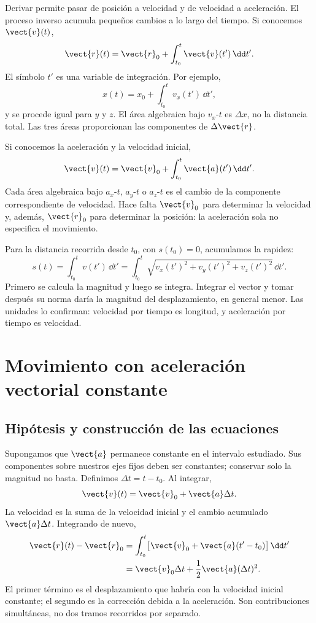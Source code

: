 Derivar permite pasar de posición a velocidad y de velocidad a aceleración.
El proceso inverso acumula pequeños cambios a lo largo del tiempo.
Si conocemos \(\vect{v}(t)\),
\[ \vect{r}(t)=\vect{r}_0+\int_{t_0}^{t}\vect{v}(t')\,\dd t'. \]
El símbolo \(t'\) es una variable de integración. Por ejemplo,
\[ x(t)=x_0+\int_{t_0}^{t}v_x(t')\,\dd t', \]
y se procede igual para \(y\) y \(z\). El área algebraica bajo
\(v_x\)-\(t\) es \(\Delta x\), no la distancia total. Las tres áreas
proporcionan las componentes de \(\Delta\vect{r}\).

Si conocemos la aceleración y la velocidad inicial,
\[ \vect{v}(t)=\vect{v}_0+\int_{t_0}^{t}\vect{a}(t')\,\dd t'. \]
Cada área algebraica bajo \(a_x\)-\(t\), \(a_y\)-\(t\) o \(a_z\)-\(t\)
es el cambio de la componente correspondiente de velocidad. Hace falta
\(\vect{v}_0\) para determinar la velocidad y, además, \(\vect{r}_0\)
para determinar la posición: la aceleración sola no especifica el movimiento.

Para la distancia recorrida desde \(t_0\), con \(s(t_0)=0\), acumulamos
la rapidez:
\[ s(t)=\int_{t_0}^{t}v(t')\,\dd t'
=\int_{t_0}^{t}\sqrt{v_x(t')^2+v_y(t')^2+v_z(t')^2}\,\dd t'. \]
Primero se calcula la magnitud y luego se integra. Integrar el vector y
tomar después su norma daría la magnitud del desplazamiento, en general
menor. Las unidades lo confirman: velocidad por tiempo es longitud,
y aceleración por tiempo es velocidad.

\section{Movimiento con aceleración vectorial constante}

\subsection{Hipótesis y construcción de las ecuaciones}

Supongamos que \(\vect{a}\) permanece constante en el intervalo estudiado.
Sus componentes sobre nuestros ejes fijos deben ser constantes; conservar
solo la magnitud no basta. Definimos \(\Delta t=t-t_0\). Al integrar,
\[ \vect{v}(t)=\vect{v}_0+\vect{a}\Delta t. \]
La velocidad es la suma de la velocidad inicial y el cambio acumulado
\(\vect{a}\Delta t\). Integrando de nuevo,
\[
\begin{aligned}
\vect{r}(t)-\vect{r}_0
&=\int_{t_0}^{t}\bigl[\vect{v}_0+\vect{a}(t'-t_0)\bigr]\,\dd t'\\
&=\vect{v}_0\Delta t+\frac12\vect{a}(\Delta t)^2.
\end{aligned}
\]
El primer término es el desplazamiento que habría con la velocidad inicial
constante; el segundo es la corrección debida a la aceleración. Son
contribuciones simultáneas, no dos tramos recorridos por separado.

